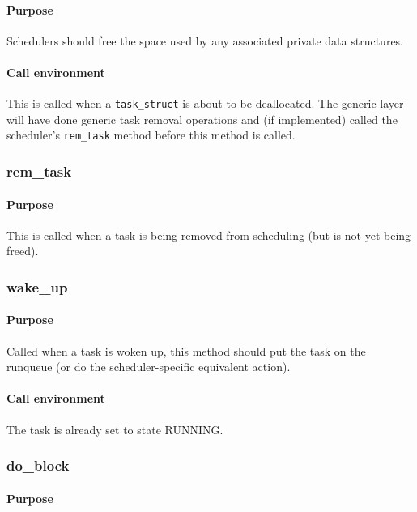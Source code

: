 \documentclass[11pt,twoside,final,openright]{xenstyle}
\begin{document}
\paragraph*{Purpose}

Schedulers should free the space used by any associated private data
structures.

\paragraph*{Call environment}

This is called when a {\tt task\_struct} is about to be deallocated.
The generic layer will have done generic task removal operations and
(if implemented) called the scheduler's {\tt rem\_task} method before
this method is called.

\subsubsection{rem\_task}

\paragraph*{Purpose}

This is called when a task is being removed from scheduling (but is
not yet being freed).

\subsubsection{wake\_up}

\paragraph*{Purpose}

Called when a task is woken up, this method should put the task on the runqueue
(or do the scheduler-specific equivalent action).

\paragraph*{Call environment}

The task is already set to state RUNNING.

\subsubsection{do\_block}

\paragraph*{Purpose}
\end{document}
